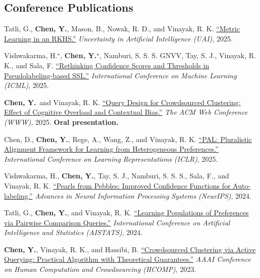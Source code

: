 \documentclass[11pt,letterpaper]{article}
\newcommand{\me}{\textbf{Chen, Y.}}
\begin{document}
\subsection*{Conference Publications}
\begin{pubs}[resume]
\item Tatli, G., \me, Mason, B., Nowak, R. D., and Vinayak, R. K.
\href{https://proceedings.mlr.press/v286/tatli25a.html}{``Metric Learning in an RKHS.''}
\textit{Uncertainty in Artificial Intelligence (UAI)}, 2025.

\item Vishwakarma, H.$^\star$, \me$^\star$, Namburi, S. S. S. GNVV, Tay, S. J., Vinayak, R. K., and Sala, F.
\href{https://proceedings.mlr.press/v267/vishwakarma25a.html}{``Rethinking Confidence Scores and Thresholds in Pseudolabeling-based SSL.''}
\textit{International Conference on Machine Learning (ICML)}, 2025.

\item \me\ and Vinayak, R. K.
\href{https://doi.org/10.1145/3696410.3714587}{``Query Design for Crowdsourced Clustering: Effect of Cognitive Overload and Contextual Bias.''}
\textit{The ACM Web Conference (WWW)}, 2025. \textbf{Oral presentation.}

\item Chen, D., \me, Rege, A., Wang, Z., and Vinayak, R. K.
\href{https://openreview.net/forum?id=1kFDrYCuSu}{``PAL: Pluralistic Alignment Framework for Learning from Heterogeneous Preferences.''}
\textit{International Conference on Learning Representations (ICLR)}, 2025.

\item Vishwakarma, H., \me, Tay, S. J., Namburi, S. S. S., Sala, F., and Vinayak, R. K.
\href{https://proceedings.neurips.cc/paper_files/paper/2024/hash/1d051fb631f104cb2a621451f37676b9-Abstract-Conference.html}{``Pearls from Pebbles: Improved Confidence Functions for Auto-labeling.''}
\textit{Advances in Neural Information Processing Systems (NeurIPS)}, 2024.

\item Tatli, G., \me, and Vinayak, R. K.
\href{https://proceedings.mlr.press/v238/tatli24a.html}{``Learning Populations of Preferences via Pairwise Comparison Queries.''}
\textit{International Conference on Artificial Intelligence and Statistics (AISTATS)}, 2024.

\item \me, Vinayak, R. K., and Hassibi, B.
\href{https://doi.org/10.1609/hcomp.v11i1.27545}{``Crowdsourced Clustering via Active Querying: Practical Algorithm with Theoretical Guarantees.''}
\textit{AAAI Conference on Human Computation and Crowdsourcing (HCOMP)}, 2023.
\end{pubs}
\end{document}

